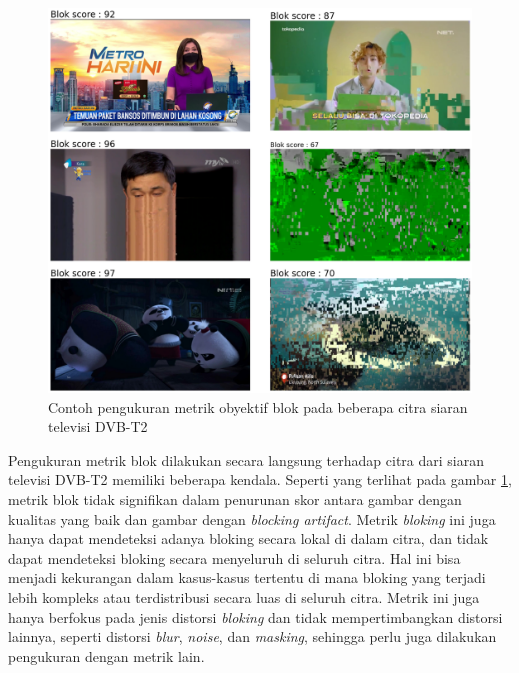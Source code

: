 \begin{figure}[H]
	\vspace{-0.1cm}
	\begin{center}
		\includegraphics[width=1\columnwidth]{bab4/Gambar/sample-blok.png}
	\end{center}
	\vspace{-0.2cm}
	\caption{Contoh pengukuran metrik obyektif  blok pada beberapa citra siaran televisi DVB-T2}
	\label{sample-blok}
\end{figure}

Pengukuran metrik blok dilakukan secara langsung terhadap citra dari siaran televisi DVB-T2 memiliki beberapa kendala. Seperti yang terlihat pada gambar \ref{sample-blok}, metrik blok tidak signifikan dalam penurunan skor antara gambar dengan kualitas yang baik dan gambar dengan \textit{blocking artifact}. Metrik \textit{bloking} ini juga hanya dapat mendeteksi adanya bloking secara lokal di dalam citra, dan tidak dapat mendeteksi bloking secara menyeluruh di seluruh citra. Hal ini bisa menjadi kekurangan dalam kasus-kasus tertentu di mana bloking yang terjadi lebih kompleks atau terdistribusi secara luas di seluruh citra. Metrik ini juga hanya berfokus pada jenis distorsi \textit{bloking} dan tidak mempertimbangkan distorsi lainnya, seperti distorsi \textit{blur}, \textit{noise}, dan \textit{masking}, sehingga perlu juga dilakukan pengukuran dengan metrik lain.


